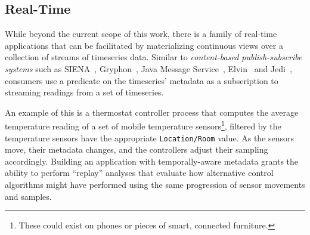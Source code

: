 \subsection{Real-Time}

While beyond the current scope of this work, there is a family of real-time
applications that can be facilitated by materializing continuous views over a
collection of streams of timeseries data. Similar to \emph{content-based
publish-subscribe systems} such as SIENA~\cite{carzaniga2000achieving},
Gryphon~\cite{strom1998gryphon}, Java Message Service~\cite{hapner2002java},
Elvin~\cite{segall1997elvin} and Jedi~\cite{cugola2001jedi}, consumers use a
predicate on the timeseries' metadata as a subscription to streaming readings
from a set of timeseries.

An example of this is a thermostat controller process that computes the
average temperature reading of a set of mobile temperature sensors\footnote{These
could exist on phones or pieces of smart, connected furniture.}, filtered by
the temperature sensors have the appropriate \texttt{Location/Room} value. As
the sensors move, their metadata changes, and the controllers adjust their
sampling accordingly. Building an application with temporally-aware metadata
grants the ability to perform ``replay'' analyses that evaluate how
alternative control algorithms might have performed using the same progression
of sensor movements and samples.

